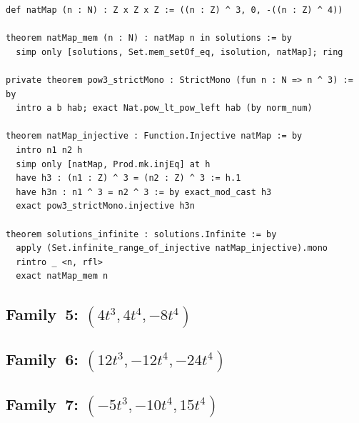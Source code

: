 \documentclass[12pt,a4paper]{article}
\theoremstyle{definition}
\begin{document}
\begin{lstlisting}[language=Lean4,caption={Injectivity and infinitude.}]
def natMap (n : N) : Z x Z x Z := ((n : Z) ^ 3, 0, -((n : Z) ^ 4))

theorem natMap_mem (n : N) : natMap n in solutions := by
  simp only [solutions, Set.mem_setOf_eq, isolution, natMap]; ring

private theorem pow3_strictMono : StrictMono (fun n : N => n ^ 3) := by
  intro a b hab; exact Nat.pow_lt_pow_left hab (by norm_num)

theorem natMap_injective : Function.Injective natMap := by
  intro n1 n2 h
  simp only [natMap, Prod.mk.injEq] at h
  have h3 : (n1 : Z) ^ 3 = (n2 : Z) ^ 3 := h.1
  have h3n : n1 ^ 3 = n2 ^ 3 := by exact_mod_cast h3
  exact pow3_strictMono.injective h3n

theorem solutions_infinite : solutions.Infinite := by
  apply (Set.infinite_range_of_injective natMap_injective).mono
  rintro _ <n, rfl>
  exact natMap_mem n
\end{lstlisting}

\subsection{Family~5: $(4t^3, 4t^4, -8t^4)$}\label{sec:fam5}

\subsection{Family~6: $(12t^3, -12t^4, -24t^4)$}\label{sec:fam6}

\subsection{Family~7: $(-5t^3, -10t^4, 15t^4)$}\label{sec:fam7}
\end{document}
